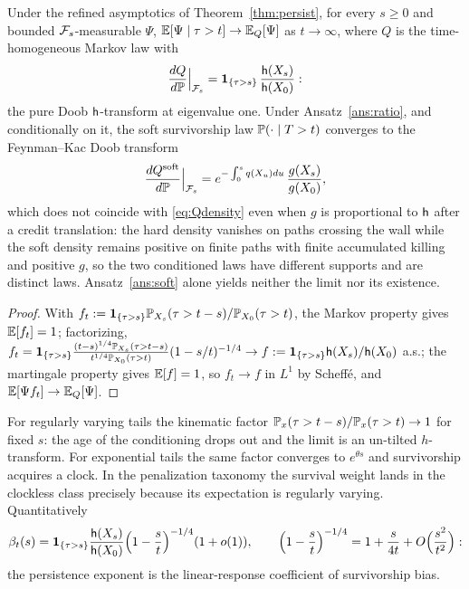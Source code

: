 \begin{theorem}\label{thm:Q}
Under the refined asymptotics of Theorem~\ref{thm:persist}, for every
$s\ge0$ and bounded $\mathcal{F}_s$-measurable $\Psi$,
$\mathbb{E}[\Psi\mid\tau>t]\to\mathbb{E}_Q[\Psi]$ as $t\to\infty$, where $Q$ is the
time-homogeneous Markov law with
\begin{equation}\label{eq:Qdensity}
\frac{dQ}{d\mathbb{P}}\Big|_{\mathcal{F}_s}
=\mathbf{1}_{\{\tau>s\}}\,\frac{\mathsf{h}(X_s)}{\mathsf{h}(X_0)}:
\end{equation}
the pure Doob $\mathsf{h}$-transform at eigenvalue one. Under
Ansatz~\ref{ans:ratio}, and conditionally on it, the soft
survivorship law $\mathbb{P}(\cdot\mid T>t)$ converges to the Feynman--Kac
Doob transform
\begin{equation}\label{eq:Qsoft}
\frac{dQ^{\mathrm{soft}}}{d\mathbb{P}}\Big|_{\mathcal{F}_s}
=e^{-\int_0^sq(X_u)du}\,\frac{g(X_s)}{g(X_0)},
\end{equation}
which does not coincide with \eqref{eq:Qdensity} even when $g$ is proportional to $\mathsf{h}$ after a credit translation: the hard density vanishes on paths crossing the wall while the soft density remains positive on finite paths with finite accumulated killing and positive $g$, so the two conditioned laws have different supports and are distinct laws. Ansatz~\ref{ans:soft}
alone yields neither the limit nor its existence.
\end{theorem}

\begin{proof}
With $f_t:=\mathbf{1}_{\{\tau>s\}}\mathbb{P}_{X_s}(\tau>t-s)/\mathbb{P}_{X_0}(\tau>t)$,
the Markov property gives $\mathbb{E}[f_t]=1$; factorizing,
$f_t=\mathbf{1}_{\{\tau>s\}}
\frac{(t-s)^{1/4}\mathbb{P}_{X_s}(\tau>t-s)}{t^{1/4}\mathbb{P}_{X_0}(\tau>t)}
(1-s/t)^{-1/4}\to f:=\mathbf{1}_{\{\tau>s\}}\mathsf{h}(X_s)/\mathsf{h}(X_0)$ a.s.; the
martingale property gives $\mathbb{E}[f]=1$, so $f_t\to f$ in $L^1$ by
Scheff\'e, and $\mathbb{E}[\Psi f_t]\to\mathbb{E}_Q[\Psi]$.
\end{proof}

\begin{remark}
\label{rem:noclock}
For regularly varying tails the kinematic factor
$\mathbb{P}_x(\tau>t-s)/\mathbb{P}_x(\tau>t)\to1$ for fixed $s$: the age of the
conditioning drops out and the limit is an un-tilted $h$-transform.
For exponential tails the same factor converges to $e^{\theta s}$ and
survivorship acquires a clock. In the penalization taxonomy
\cite{RVY06} the survival weight lands in the clockless class
precisely because its expectation is regularly varying. Quantitatively
\begin{equation}\label{eq:rate}
\beta_t(s)=\mathbf{1}_{\{\tau>s\}}\frac{\mathsf{h}(X_s)}{\mathsf{h}(X_0)}
\Bigl(1-\frac st\Bigr)^{-1/4}(1+o(1)),
\qquad
\Bigl(1-\frac st\Bigr)^{-1/4}=1+\frac{s}{4t}+O\Bigl(\frac{s^2}{t^2}\Bigr):
\end{equation}
the persistence exponent is the linear-response coefficient of
survivorship bias.
\end{remark}

